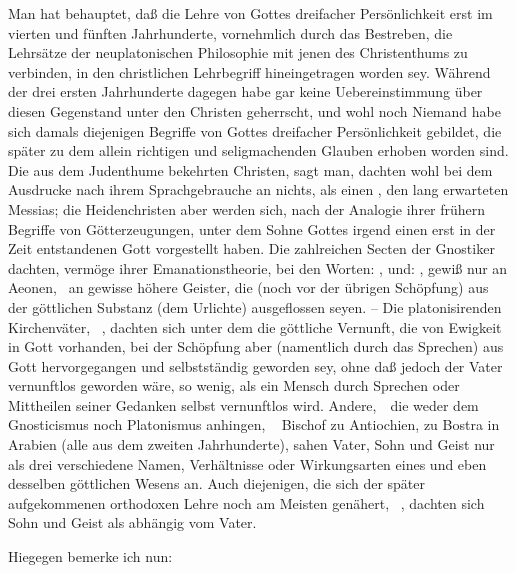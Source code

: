 Man hat behauptet, daß die Lehre von Gottes dreifacher Persönlichkeit erst im vierten und fünften Jahrhunderte, vornehmlich durch das Bestreben, die Lehrsätze der neuplatonischen Philosophie mit jenen des Christenthums zu verbinden, in den christlichen Lehrbegriff hineingetragen worden sey. Während der drei ersten Jahrhunderte dagegen habe gar keine Uebereinstimmung über diesen Gegenstand unter den Christen geherrscht, und wohl noch Niemand habe sich damals diejenigen Begriffe von Gottes dreifacher Persönlichkeit gebildet, die später zu dem allein richtigen und seligmachenden Glauben erhoben worden sind. Die aus dem Judenthume bekehrten Christen, sagt man, dachten wohl bei dem Ausdrucke  nach ihrem Sprachgebrauche an nichts, als einen , den lang erwarteten Messias; die Heidenchristen aber werden sich, nach der Analogie ihrer frühern Begriffe von Götterzeugungen, unter dem Sohne Gottes irgend einen erst in der Zeit entstandenen Gott vorgestellt haben. Die zahlreichen Secten der Gnostiker dachten, vermöge ihrer Emanationstheorie, bei den Worten: , und: , gewiß nur an Aeonen, \dh\ an gewisse höhere Geister, die (noch vor der übrigen Schöpfung) aus der göttlichen Substanz (dem Urlichte) ausgeflossen seyen. -- Die platonisirenden Kirchenväter, \zB\ , dachten sich unter dem  die göttliche Vernunft, die von Ewigkeit in Gott vorhanden, bei der Schöpfung aber (namentlich durch das Sprechen) aus Gott hervorgegangen und selbstständig geworden sey, ohne daß jedoch der Vater vernunftlos geworden wäre, so wenig, als ein Mensch durch Sprechen oder Mittheilen seiner Gedanken selbst vernunftlos wird. Andere,~\ die weder dem Gnosticismus noch Platonismus anhingen, \zB\  Bischof zu Antiochien, zu Bostra in Arabien (alle aus dem zweiten Jahrhunderte), sahen Vater, Sohn und Geist nur als drei verschiedene Namen, Verhältnisse oder Wirkungsarten eines und eben desselben göttlichen Wesens an. Auch diejenigen, die sich der später aufgekommenen orthodoxen Lehre noch am Meisten genähert, \zB\ , dachten sich Sohn und Geist als abhängig vom Vater.\par
Hiegegen bemerke ich nun:
